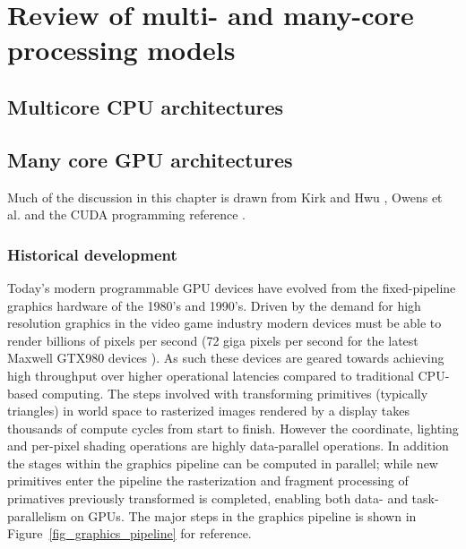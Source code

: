 \chapter{Review of multi- and many-core processing models}
\section{Multicore CPU architectures}
\section{Many core GPU architectures}
Much of the discussion in this chapter is drawn from Kirk and Hwu \cite[ch. 1-3]{kirk2012programming}, Owens et al. \cite{owens2008gpu} and the CUDA
programming reference \cite{cuda}.
\subsection{Historical development}
Today's modern programmable GPU devices have evolved from the fixed-pipeline graphics hardware of the 1980's and 1990's. Driven by the demand
for high resolution graphics in the video game industry modern devices must be able to render billions of pixels per second (72 giga pixels per second 
for the latest Maxwell GTX980 devices \cite{gtx980}). As such these devices are geared towards achieving high throughput over higher operational latencies compared to traditional
CPU-based computing. The steps involved with transforming primitives (typically triangles) in world space to rasterized images rendered by a display takes thousands
of compute cycles from start to finish. However the coordinate, lighting and per-pixel shading operations are highly data-parallel operations. In addition the stages within
the graphics pipeline can be computed in parallel; while new primitives enter the pipeline the rasterization and fragment processing of primatives previously transformed is 
completed, enabling both data- and task-parallelism on GPUs. The major steps in the graphics pipeline is shown in Figure~\ref{fig_graphics_pipeline} for reference.


